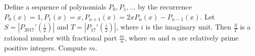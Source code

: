 Define a sequence of polynomials $P_0,P_1,...$ by the recurrence $P_0(x)=1, P_1(x)=x, P_{n+1}(x) = 2xP_n(x)-P_{n-1}(x)$. Let $S=\left|P_{2017}'\left(\frac{i}{2}\right)\right|$ and $T=\left|P_{17}'\left(\frac{i}{2}\right)\right|$, where $i$ is the imaginary unit. Then $\frac{S}{T}$ is a rational number with fractional part $\frac{m}{n}$, where $m$ and $n$ are relatively prime positive integers. Compute $m$.
